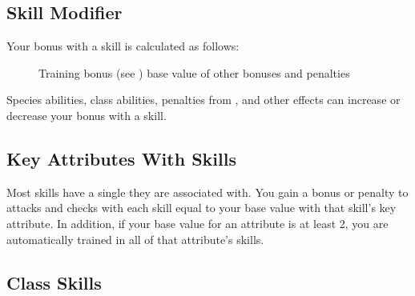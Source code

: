     \subsection{Skill Modifier}\label{Skill Modifier}

        Your bonus with a skill is calculated as follows:

        \begin{figure}[h]
            \centering Training bonus (see ) \add base value of  \add other bonuses and penalties
        \end{figure}

         Species abilities, class abilities, penalties from , and other effects can increase or decrease your bonus with a skill.

    \subsection{Key Attributes With Skills}\label{Key Attributes With Skills}
        Most skills have a single  they are associated with.
        You gain a bonus or penalty to attacks and checks with each skill equal to your base value with that skill's key attribute.
        In addition, if your base value for an attribute is at least 2, you are automatically trained in all of that attribute's skills.

    \subsection{Class Skills}

